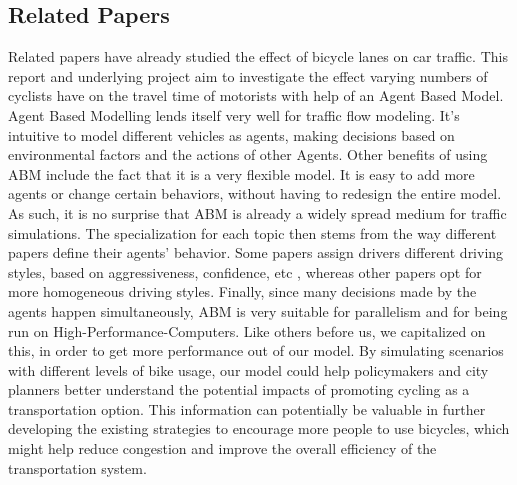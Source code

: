 \subsection{Related Papers}
Related papers have already studied the effect of bicycle lanes on car traffic. \cite{bikelanes}
This report and underlying project aim to investigate the effect varying numbers of cyclists have on the travel time of motorists with help of an Agent Based Model. Agent Based Modelling lends itself very well for traffic flow modeling. It's intuitive to model different vehicles as agents, making decisions based on environmental factors and the actions of other Agents. Other benefits of using ABM include the fact that it is a very flexible model. It is easy to add more agents or change certain behaviors, without having to redesign the entire model. \cite{bazghandi} As such, it is no surprise that ABM is already a widely spread medium for traffic simulations. The specialization for each topic then stems from the way different papers define their agents' behavior. Some papers assign drivers different driving styles, based on aggressiveness, confidence, etc \cite{abmfortraffic}, whereas other papers opt for more homogeneous driving styles. \cite{sanfran} Finally, since many decisions made by the agents happen simultaneously, ABM is very suitable for parallelism and for being run on High-Performance-Computers. \cite{cuda} Like others before us, we capitalized on this, in order to get more performance out of our model. By simulating scenarios with different levels of bike usage, our model could help policymakers and city planners better understand the potential impacts of promoting cycling as a transportation option. This information can potentially be valuable in further developing the existing strategies to encourage more people to use bicycles, which might help reduce congestion and improve the overall efficiency of the transportation system. 







